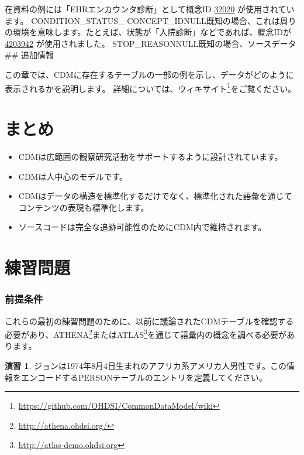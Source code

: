\documentclass[
  11pt]{book}
\makeatletter
\newenvironment{kframe}{%
\medskip{}
\setlength{\fboxsep}{.8em}
 \def\at@end@of@kframe{}%
 \ifinner\ifhmode%
  \def\at@end@of@kframe{\end{minipage}}%
  \begin{minipage}{\columnwidth}%
 \fi\fi%
 \def\FrameCommand##1{\hskip\@totalleftmargin \hskip-\fboxsep
 \colorbox{myShadeColor}{##1}\hskip-\fboxsep
     \hskip-\linewidth \hskip-\@totalleftmargin \hskip\columnwidth}%
 \MakeFramed {\advance\hsize-\width
   \@totalleftmargin\z@ \linewidth\hsize
   \@setminipage}}%
 {\par\unskip\endMakeFramed%
 \at@end@of@kframe}
\newenvironment{rmdblock}[1]
  {
  \begin{itemize}
  \renewcommand{\labelitemi}{
    \raisebox{-.7\height}[0pt][0pt]{
      {\setkeys{Gin}{width=3em,keepaspectratio}\texttt{[image: images/\#1]}}
    }
  }
  \setlength{\fboxsep}{1em}
  \begin{kframe}
  \item
  }
  {
  \end{kframe}
  \end{itemize}
  }
\newenvironment{rmdsummary}
  {\begin{rmdblock}{summary}}
  {\end{rmdblock}}
\theoremstyle{definition}
\theoremstyle{definition}
\theoremstyle{definition}
\newtheorem{exercise}{演習}[chapter]
\theoremstyle{definition}
\theoremstyle{remark}
\makeatother
\begin{document}
在資料の例には「EHRエンカウンタ診断」として概念ID \href{http://athena.ohdsi.org/search-terms/terms/32020}{32020}
が使用されています。\textbar{}
\textbar CONDITION\_STATUS\_ CONCEPT\_ID\textbar NULL\textbar 既知の場合、これは周りの環境を意味します。たとえば、状態が「入院診断」などであれば、概念IDが \href{http://athena.ohdsi.org/search-terms/terms/4203942}{4203942} が使用されました。\textbar{}
\textbar STOP\_REASON\textbar NULL\textbar 既知の場合、ソースデータ
\#\# 追加情報

この章では、CDMに存在するテーブルの一部の例を示し、データがどのように表示されるかを説明します。 詳細については、ウィキサイト\footnote{\url{https://github.com/OHDSI/CommonDataModel/wiki}}をご覧ください。

\section{まとめ}\label{ux307eux3068ux3081-2}

\begin{rmdsummary}
\begin{itemize}
\item
  CDMは広範囲の観察研究活動をサポートするように設計されています。
\item
  CDMは人中心のモデルです。
\item
  CDMはデータの構造を標準化するだけでなく、標準化された語彙を通じてコンテンツの表現も標準化します。
\item
  ソースコードは完全な追跡可能性のためにCDM内で維持されます。
\end{itemize}
\end{rmdsummary}

\section{練習問題}\label{ux7df4ux7fd2ux554fux984c}

\subsubsection*{前提条件}\label{ux524dux63d0ux6761ux4ef6}

これらの最初の練習問題のために、以前に議論されたCDMテーブルを確認する必要があり、ATHENA\footnote{\url{http://athena.ohdsi.org/}}またはATLAS\footnote{\url{http://atlas-demo.ohdsi.org}}を通じて語彙内の概念を調べる必要があります。

\begin{exercise}
\protect\hypertarget{exr:exerciseJohnPerson}{}\label{exr:exerciseJohnPerson}ジョンは1974年8月4日生まれのアフリカ系アメリカ人男性です。この情報をエンコードするPERSONテーブルのエントリを定義してください。
\end{exercise}
\end{document}
